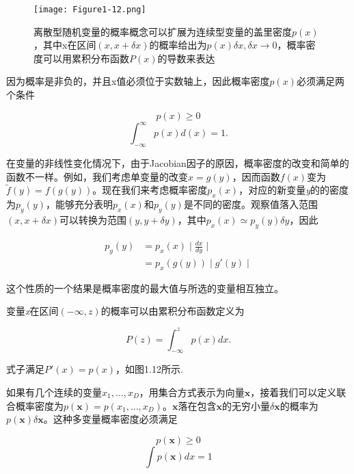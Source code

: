 	\begin{figure}[t]
		\parbox{.4\textwidth}{\caption{离散型随机变量的概率概念可以扩展为连续型变量的盖里密度$p(x)$，其中x在区间$(x, x + \delta x)$的概率给出为$p(x)\delta x, \delta x \to 0$，概率密度可以用累积分布函数$P(x)$的导数来表达}}
		\parbox{.5\textwidth}{\texttt{[image: Figure1-12.png]}}
	\end{figure}
	
	因为概率是非负的，并且x值必须位于实数轴上，因此概率密度$p(x)$必须满足两个条件
	
	\begin{equation}
	p(x) \geq 0
	\end{equation}
	\begin{equation}
	\int_{- \infty}^{\infty} p(x) d(x) = 1.
	\end{equation}
	
	在变量的非线性变化情况下，由于Jacobian因子的原因，概率密度的改变和简单的函数不一样。例如，我们考虑单变量的改变$x = g(y)$，因而函数$f(x)$变为$\tilde{f}(y) = f(g(y))$。现在我们来考虑概率密度$p_x(x)$，对应的新变量\textit{y}的的密度为$p_y(y)$，能够充分表明$p_x(x)$和$p_y(y)$是不同的密度。观察值落入范围$(x, x + \delta x)$可以转换为范围$(y, y + \delta y)$，其中$p_x(x) \simeq p_y(y) \delta y$，因此
	
	\begin{equation}
	\begin{aligned}
	p_y(y) & = p_x(x) \mid \frac{dx}{dy} \mid\\
		   & = p_x(g(y)) \mid g' (y) \mid
	\end{aligned}
	\end{equation}
	
	这个性质的一个结果是概率密度的最大值与所选的变量相互独立。
	
	变量\textit{x}在区间$(- \infty, z)$的概率可以由累积分布函数定义为
	
	\begin{equation}
	P(z) = \int_{- \infty}^{z} p(x)dx.
	\end{equation}
	
	式子满足$P'(x) = p(x)$，如图1.12所示.
	
	如果有几个连续的变量$x_1, \dots, x_D$，用集合方式表示为向量$\mathbf{x}$，接着我们可以定义联合概率密度为$p(\mathbf{x}) = p(x_1, \dots, x_D)$。$\mathbf{x}$落在包含$\mathbf{x}$的无穷小量$\delta \mathbf{x}$的概率为$p(\mathbf{x}) \delta \mathbf{x}$。这种多变量概率密度必须满足
	
	\begin{equation}
	p(\mathbf{x}) \geq 0
	\end{equation}
	\begin{equation}
	\int p(\mathbf{x}) dx = 1
	\end{equation}
	
